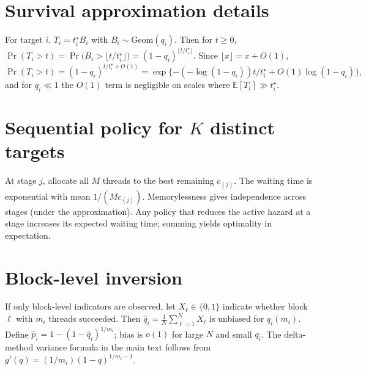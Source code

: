 \documentclass[11pt]{article}
\newcommand{\E}{\mathbb{E}}
\newcommand{\1}{\mathbf{1}}
\begin{document}
\bigskip



\appendix

\section{Survival approximation details}
For target $i$, $T_i=t_i^\star B_i$ with $B_i\sim\mathrm{Geom}(q_i)$. Then for $t\ge 0$,
\(
\Pr(T_i>t)=\Pr\!\big(B_i> \lfloor t/t_i^\star\rfloor\big)=(1-q_i)^{\lfloor t/t_i^\star\rfloor}.
\)
Since $\lfloor x\rfloor=x+O(1)$,
\(
\Pr(T_i>t)=(1-q_i)^{t/t_i^\star+O(1)}=\exp\{-(-\log(1-q_i))t/t_i^\star + O(1)\log (1-q_i)\},
\)
and for $q_i\ll 1$ the $O(1)$ term is negligible on scales where $\E[T_i]\gg t_i^\star$.

\section{Sequential policy for $K$ distinct targets}
At stage $j$, allocate all $M$ threads to the best remaining $c_{(j)}$. The waiting time is exponential with mean $1/(M c_{(j)})$. Memorylessness gives independence across stages (under the approximation). Any policy that reduces the active hazard at a stage increases its expected waiting time; summing yields optimality in expectation.

\section{Block-level inversion}
If only block-level indicators are observed, let $X_\ell\in\{0,1\}$ indicate whether block $\ell$ with $m_i$ threads succeeded. Then $\hat q_i=\frac{1}{N}\sum_{\ell=1}^N X_\ell$ is unbiased for $q_i(m_i)$. Define $\hat p_i = 1-(1-\hat q_i)^{1/m_i}$; bias is $o(1)$ for large $N$ and small $q_i$. The delta-method variance formula in the main text follows from $g'(q)=(1/m_i)(1-q)^{1/m_i-1}$.
\end{document}
